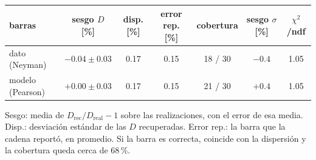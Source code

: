 \begin{tabular}{lcccccc}
\toprule
\textbf{barras} & \textbf{sesgo $D$ [\%]} & \textbf{disp. [\%]} & \textbf{error rep. [\%]} & \textbf{cobertura} & \textbf{sesgo $\sigma$ [\%]} & \textbf{$\chi^2$/ndf} \\
\midrule
dato (Neyman) & $-0.04 \pm 0.03$ & 0.17 & 0.15 & 18 / 30 & $-0.4$ & 1.05 \\
modelo (Pearson) & $+0.00 \pm 0.03$ & 0.17 & 0.15 & 21 / 30 & $+0.4$ & 1.05 \\
\bottomrule
\end{tabular}
\par\smallskip
\begin{minipage}{0.95\linewidth}\footnotesize Sesgo: media de $D_{\text{rec}}/D_{\text{real}} - 1$ sobre las realizaciones, con el error de esa media. Disp.: desviación estándar de las $D$ recuperadas. Error rep.: la barra que la cadena reportó, en promedio. Si la barra es correcta, coincide con la dispersión y la cobertura queda cerca de 68\,\%.\end{minipage}
